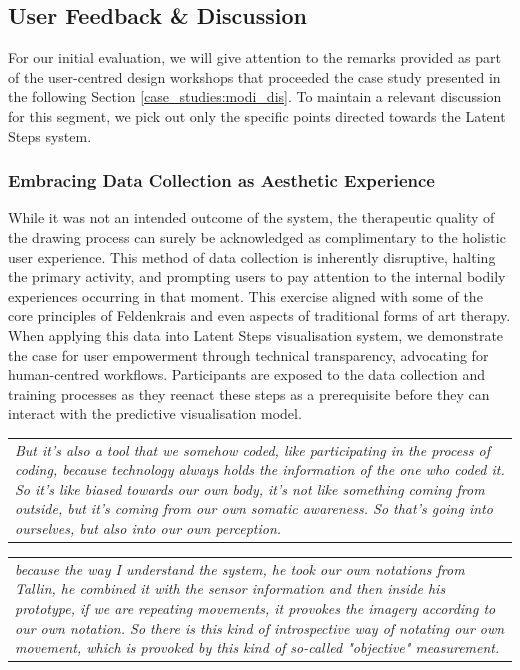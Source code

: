 \subsection{User Feedback \& Discussion}

For our initial evaluation, we will give attention to the remarks provided as part of the user-centred design workshops that proceeded the case study presented in the following Section \ref{case_studies:modi_dis}. To maintain a relevant discussion for this segment, we pick out only the specific points directed towards the Latent Steps system.

\subsubsection{Embracing Data Collection as Aesthetic Experience}

While it was not an intended outcome of the system, the therapeutic quality of the drawing process can surely be acknowledged as complimentary to the holistic user experience. This method of data collection is inherently disruptive, halting the primary activity, and prompting users to pay attention to the internal bodily experiences occurring in that moment. This exercise aligned with some of the core principles of Feldenkrais and even aspects of traditional forms of art therapy. When applying this data into Latent Steps visualisation system, we demonstrate the case for user empowerment through technical transparency, advocating for human-centred workflows. Participants are exposed to the data collection and training processes as they reenact these steps as a prerequisite before they can interact with the predictive visualisation model.

\begin{center}
\begin{tabular}{ p{13cm}}
\textit{But it's also a tool that we somehow coded, like participating in the process of coding, because technology always holds the information of the one who coded it. So it's like biased towards our own body, it's not like something coming from outside, but it's coming from our own somatic awareness. So that's going into ourselves, but also into our own perception.}
\end{tabular}
\end{center}

\begin{center}
\begin{tabular}{ p{13cm}}
\textit{because the way I understand the system, he took our own notations from Tallin, he combined it with the sensor information and then inside his prototype, if we are repeating movements, it provokes the imagery according to our own notation. So there is this kind of introspective way of notating our own movement, which is provoked by this kind of so-called "objective" measurement.}
\end{tabular}
\end{center}

